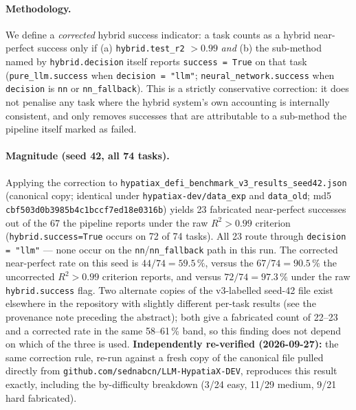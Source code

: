 \documentclass[twoside,11pt]{article}
\newcommand{\Rsq}{R^{2}}
\begin{document}
\paragraph{Methodology.} We define a \emph{corrected} hybrid success indicator:
a task counts as a hybrid near-perfect success only if (a)
\texttt{hybrid.test\_r2} $> 0.99$ \emph{and} (b) the sub-method named by
\texttt{hybrid.decision} itself reports \texttt{success = True} on that task
(\texttt{pure\_llm.success} when \texttt{decision = "llm"};
\texttt{neural\_network.success} when \texttt{decision} is \texttt{nn} or
\texttt{nn\_fallback}). This is a strictly conservative correction: it does
not penalise any task where the hybrid system's own accounting is internally
consistent, and only removes successes that are attributable to a sub-method
the pipeline itself marked as failed.

\paragraph{Magnitude (seed 42, all 74 tasks).}
Applying the correction to
\texttt{hypatiax\_defi\_benchmark\_v3\_results\_seed42.json}
(canonical copy; identical under \texttt{hypatiax-dev/data\_exp} and \texttt{data\_old}; md5 \texttt{cbf503d0b3985b4c1bccf7ed18e0316b}) yields
23 fabricated near-perfect successes out of the 67 the pipeline reports
under the raw $\Rsq>0.99$ criterion (\texttt{hybrid.success=True} occurs
on 72 of 74 tasks). All 23 route through
\texttt{decision = "llm"} --- none occur on the
\texttt{nn}/\texttt{nn\_fallback} path in this run. The corrected
near-perfect rate on this seed is $44/74 = 59.5\,\%$, versus the
$67/74 = 90.5\,\%$ the uncorrected $\Rsq>0.99$ criterion reports, and
versus $72/74=97.3\,\%$ under the raw \texttt{hybrid.success} flag. Two
alternate copies of the v3-labelled seed-42 file exist elsewhere in the
repository with slightly different per-task results (see the provenance
note preceding the abstract); both give a fabricated count of 22--23 and
a corrected rate in the same 58--61\,\% band, so this finding does not
depend on which of the three is used. \textbf{Independently re-verified
(2026-09-27):} the same correction rule, re-run against a fresh copy of
the canonical file pulled directly from
\texttt{github.com/sednabcn/LLM-HypatiaX-DEV}, reproduces this result
exactly, including the by-difficulty breakdown (3/24 easy, 11/29 medium,
9/21 hard fabricated).
\end{document}
